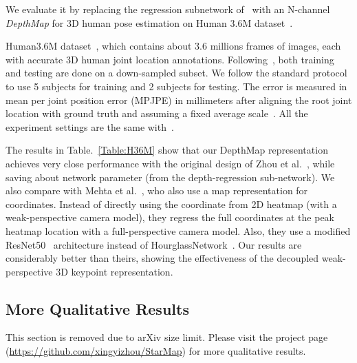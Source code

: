 \documentclass[runningheads]{llncs}
\begin{document}
We evaluate it by replacing the regression subnetwork of~\cite{Zhou_2017_ICCV} with an N-channel \emph{DepthMap} for 3D human pose estimation on Human 3.6M dataset~\cite{h36m_pami}. 

Human3.6M dataset~\cite{h36m_pami}, which contains about 3.6 millions frames of images, each with accurate 3D human joint location annotations. Following~\cite{Zhou_2017_ICCV,pavlakos2017coarse}, both training and testing are done on a  down-sampled subset. 
We follow the standard protocol to use 5 subjects for training and 2 subjects for testing. 
The error is measured in mean per joint position error (MPJPE) in millimeters after aligning the root joint location with ground truth and assuming a fixed average scale~\cite{Zhou_2017_ICCV,pavlakos2017coarse}.
All the experiment settings are the same with~\cite{Zhou_2017_ICCV}. 


The results in Table.~\ref{Table:H36M} show that our DepthMap representation achieves very close performance with the original design of Zhou et al.~\cite{Zhou_2017_ICCV}, 
while saving about  network parameter (from the depth-regression sub-network).
We also compare with Mehta et al.~\cite{VNect_SIGGRAPH2017}, who also use a map representation for  coordinates. 
Instead of directly using the  coordinate from 2D heatmap (with a weak-perspective camera model), they regress the full  coordinates at the peak heatmap location with a full-perspective camera model. 
Also, they use a modified ResNet50~\cite{he2016deep} architecture instead of HourglassNetwork~\cite{newell2016stacked}. 
Our results are considerably better than theirs, showing the effectiveness of the decoupled weak-perspective 3D keypoint representation. 




\subsection{More Qualitative Results}
This section is removed due to arXiv size limit. Please visit the project page (\url{https://github.com/xingyizhou/StarMap}) for more qualitative results. 


 
\end{document}
